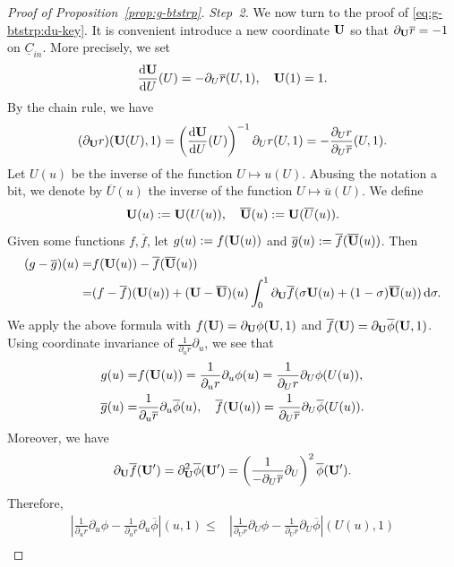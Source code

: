 \documentclass[10pt, reqno]{amsart}
\theoremstyle{definition}
\theoremstyle{remark}
\theoremstyle{conjecture}
\numberwithin{equation}{section}
\newcommand{\ud}{\mathrm{d}}
\newcommand{\rd}{\partial}
\newcommand{\0}{\emptyset}
\newcommand{\sgm}{\sigma}
\newcommand{\bfU}{{\bf U}}
\newcommand{\calI}{\mathcal I}
\newcommand{\uC}{\underline{C}}
\newcommand{\pfstep}[1]{\vspace{.5em} {\it \noindent #1.}}
\newcommand{\NI}{\calI^{+}}						%
\newcommand{\ubg}{\overline{u}}					%
\newcommand{\Ubg}{\overline{U}}					%
\newcommand{\bfUbg}{\overline{\bfU}}				%
\newcommand{\phibg}{\overline{\phi}}				%
\newcommand{\rbg}{\overline{r}}					%
\newcommand{\Abs}[1]{\left\vert #1 \right\vert}
\begin{document}
\begin{proof}[Proof of Proposition~\ref{prop:g-btstrp}]
\pfstep{Step~2}
We now turn to the proof of \eqref{eq:g-btstrp:du-key}. It is convenient introduce a new coordinate $\bfU$ so that $\rd_{\bfU} \rbg = -1$ on $\uC_{in}$. More precisely, we set
\begin{equation*}
	\frac{\ud \bfU}{\ud U} (U) = - \rd_{U} \rbg(U, 1), \quad \bfU(1) = 1.
\end{equation*}
By the chain rule, we have
\begin{equation*}
	(\rd_{\bfU} r) (\bfU(U), 1) = \left( \frac{\ud \bfU}{\ud U} (U) \right)^{-1} \rd_{U} r(U, 1) = - \frac{\rd_{U} r}{\rd_{U} \rbg} (U, 1).
\end{equation*}
Let $U(u)$ be the inverse of the function $U \mapsto u(U)$. Abusing the notation a bit, we denote by $\Ubg(u)$ the inverse of the function $U \mapsto \overline{u}(U)$. We define
\begin{equation*}
	\bfU(u) := \bfU(U(u)), \quad 
	\bfUbg(u) := \bfU(\Ubg(u)).
\end{equation*}
Given some functions $f, \overline{f}$, let $g (u) := f(\bfU(u))$ and $\overline{g}(u) := \overline{f}(\bfUbg(u))$. Then
\begin{align*}
	(g - \overline{g})(u) 
= & 	f(\bfU(u)) - \overline{f}(\bfUbg(u)) \\
= &	(f - \overline{f})(\bfU(u)) + (\bfU - \bfUbg)(u) \int_{0}^{1} \rd_{\bfU} \overline{f}(\sgm \bfU(u) + (1-\sgm) \bfUbg(u)) \, \ud \sgm.
\end{align*}
We apply the above formula with $f (\bfU)= \rd_{\bfU} \phi(\bfU, 1)$ and $\overline{f} (\bfU)= \rd_{\bfU} \phibg(\bfU, 1)$. Using coordinate invariance of $\frac{1}{\rd_{u} r} \rd_{u}$, we see that 
\begin{align*}
g (u) =& f(\bfU(u)) = \frac{1}{\rd_{u} r} \rd_{u} \phi (u) = \frac{1}{\rd_{U} r} \rd_{U} \phi(U(u)), \\
\overline{g} (u) =& \frac{1}{\rd_{u} \rbg} \rd_{u} \phibg (u), \quad
\overline{f}(\bfU(u)) = \frac{1}{\rd_{U} \rbg} \rd_{U} \phibg(U(u)).
\end{align*}
Moreover, we have
\begin{equation*}
	\rd_{\bfU} \overline{f} (\bfU') = \rd_{\bfU}^{2} \phibg (\bfU') = \left( \frac{1}{-\rd_{U} \rbg} \rd_{U} \right)^{2} \phibg (\bfU').
\end{equation*}
Therefore,
\begin{align*}
	\Abs{ \frac{1}{\rd_{u} r} \rd_{u} \phi - \frac{1}{\rd_{u} \rbg} \rd_{u} \phibg }(u,1)
	\leq &\Abs{ \frac{1}{\rd_{U} r} \rd_{U} \phi - \frac{1}{\rd_{U} \rbg} \rd_{U} \phibg } (U(u),1) \\

\end{align*}
\end{proof}
\end{document}
